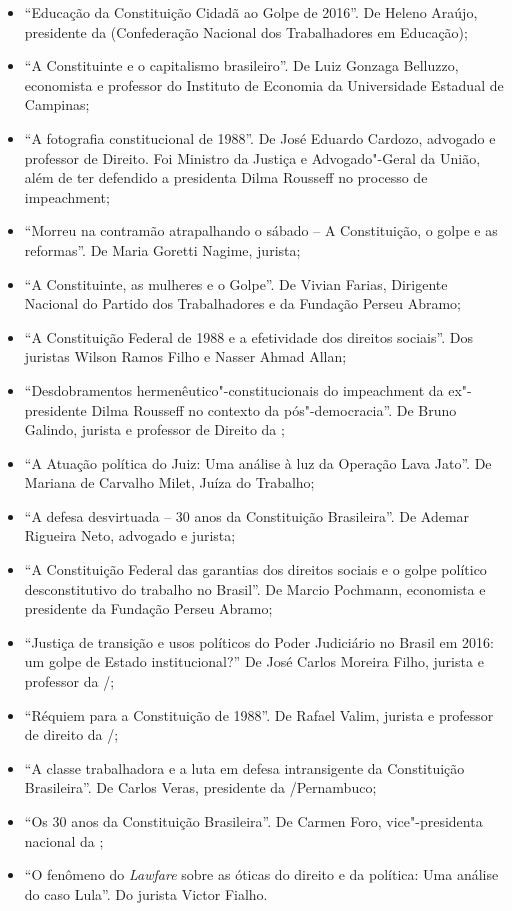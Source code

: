 \begin{itemize}
\item ``Educação da Constituição Cidadã ao Golpe de 2016''. De
Heleno Araújo, presidente da  (Confederação Nacional dos Trabalhadores em Educação);
\item ``A Constituinte e o capitalismo brasileiro''. De Luiz Gonzaga Belluzzo, economista e
professor do Instituto de Economia da Universidade Estadual de Campinas;
\item ``A fotografia constitucional de 1988''. De José
Eduardo Cardozo, advogado e professor de Direito. Foi Ministro da Justiça e Advogado"-Geral da
União, além de ter defendido a presidenta Dilma Rousseff no processo de impeachment;
\item ``Morreu na contramão atrapalhando o sábado -- A Constituição, o golpe e as
reformas''. De Maria Goretti Nagime, jurista;
\item ``A Constituinte, as mulheres e o Golpe''. De Vivian Farias, Dirigente Nacional
do Partido dos Trabalhadores e da Fundação Perseu Abramo;
\item ``A Constituição Federal de 1988 e a efetividade dos direitos sociais''. Dos
juristas Wilson Ramos Filho e Nasser Ahmad Allan;
\item ``Desdobramentos hermenêutico"-constitucionais do impeachment da ex"-presidente Dilma
Rousseff no contexto da pós"-democracia''. De Bruno Galindo, jurista e professor de Direito da
;
\item ``A Atuação política do Juiz: Uma análise à luz da Operação Lava Jato''. De Mariana
de Carvalho Milet, Juíza do Trabalho;
\item ``A defesa desvirtuada -- 30 anos da Constituição Brasileira''. De Ademar Rigueira
Neto, advogado e jurista;
\item ``A Constituição Federal das garantias dos direitos sociais e o golpe político
desconstitutivo do trabalho no Brasil''. De Marcio Pochmann, economista e presidente
da Fundação Perseu Abramo;
\item ``Justiça de transição e usos políticos do Poder Judiciário
no Brasil em 2016: um golpe de Estado institucional?'' De José Carlos Moreira Filho, jurista e
professor da /;
\item ``Réquiem para a
Constituição de 1988''. De Rafael Valim, jurista e professor de direito da /;
\item ``A classe trabalhadora e a luta em defesa
intransigente da Constituição Brasileira''. De Carlos Veras, presidente da /Pernambuco;
\item ``Os 30 anos da Constituição Brasileira''. De
Carmen Foro, vice"-presidenta nacional da ;
\item ``O fenômeno do \emph{Lawfare} sobre as óticas do direito e da política: Uma análise do caso Lula''. Do jurista Victor Fialho.
\end{itemize}

